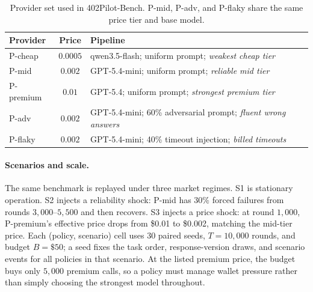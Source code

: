 \begin{table}[!htbp]
\centering
\caption{Provider set used in 402Pilot-Bench. P-mid, P-adv, and P-flaky share the same price tier and base model.}
\label{tab:providers}
\footnotesize
\setlength{\tabcolsep}{2.5pt}
\begin{tabularx}{\linewidth}{@{}lcX@{}}
\toprule
Provider & Price & Pipeline \\
\midrule
P-cheap   & $0.0005$ & qwen3.5-flash; uniform prompt; \emph{weakest cheap tier} \\
P-mid     & $0.002$  & GPT-5.4-mini; uniform prompt; \emph{reliable mid tier} \\
P-premium & $0.01$   & GPT-5.4; uniform prompt; \emph{strongest premium tier} \\
P-adv     & $0.002$  & GPT-5.4-mini; 60\% adversarial prompt; \emph{fluent wrong answers} \\
P-flaky   & $0.002$  & GPT-5.4-mini; 40\% timeout injection; \emph{billed timeouts} \\
\bottomrule
\end{tabularx}
\end{table}

\paragraph{Scenarios and scale.}
The same benchmark is replayed under three market regimes. S1 is stationary operation. S2 injects a reliability shock: P-mid has $30\%$ forced failures from rounds $3{,}000$--$5{,}500$ and then recovers. S3 injects a price shock: at round $1{,}000$, P-premium's effective price drops from \$0.01 to \$0.002, matching the mid-tier price. Each (policy, scenario) cell uses $30$ paired seeds, $T=10{,}000$ rounds, and budget $B=\$50$; a seed fixes the task order, response-version draws, and scenario events for all policies in that scenario. At the listed premium price, the budget buys only $5{,}000$ premium calls, so a policy must manage wallet pressure rather than simply choosing the strongest model throughout.

